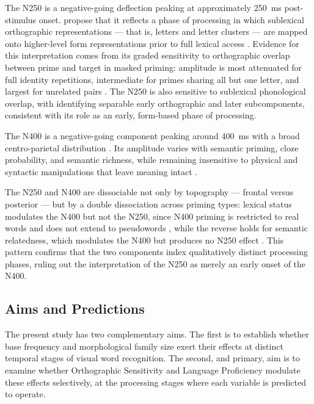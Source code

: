 The N250 is a negative-going deflection peaking at approximately 250~ms post-stimulus onset. \citet{holcombTimeCourseVisual2006} propose that it reflects a phase of processing in which sublexical orthographic representations — that is, letters and letter clusters — are mapped onto higher-level form representations prior to full lexical access \citep{holcombTimeCourseVisual2006}. Evidence for this interpretation comes from its graded sensitivity to orthographic overlap between prime and target in masked priming: amplitude is most attenuated for full identity repetitions, intermediate for primes sharing all but one letter, and largest for unrelated pairs \citep{holcombTimeCourseVisual2006, holcomb_exploring_2007}. The N250 is also sensitive to sublexical phonological overlap, with \citet{graingerTimeCourseOrthographic2006} identifying separable early orthographic and later subcomponents, consistent with its role as an early, form-based phase of processing.

The N400 is a negative-going component peaking around 400~ms with a broad centro-parietal distribution \citep{kutasReadingSenselessSentences1980}. Its amplitude varies with semantic priming, cloze probability, and semantic richness, while remaining insensitive to physical and syntactic manipulations that leave meaning intact \citep{kutasThirtyYearsCounting2011}.

The N250 and N400 are dissociable not only by topography — frontal versus posterior \citep{holcombTimeCourseVisual2006} — but by a double dissociation across priming types: lexical status modulates the N400 but not the N250, since N400 priming is restricted to real words and does not extend to pseudowords \citep{kiyonagaMaskedCrossmodalRepetition2007}, while the reverse holds for semantic relatedness, which modulates the N400 but produces no N250 effect \citep{graingerWatchingWordGo2009}. This pattern confirms that the two components index qualitatively distinct processing phases, ruling out the interpretation of the N250 as merely an early onset of the N400.


	\subsection{Aims and Predictions}

	The present study has two complementary aims. The first is to establish whether base frequency and morphological family size exert their effects at distinct temporal stages of visual word recognition. The second, and primary, aim is to examine whether Orthographic Sensitivity and Language Proficiency modulate these effects selectively, at the processing stages where each variable is predicted to operate.

